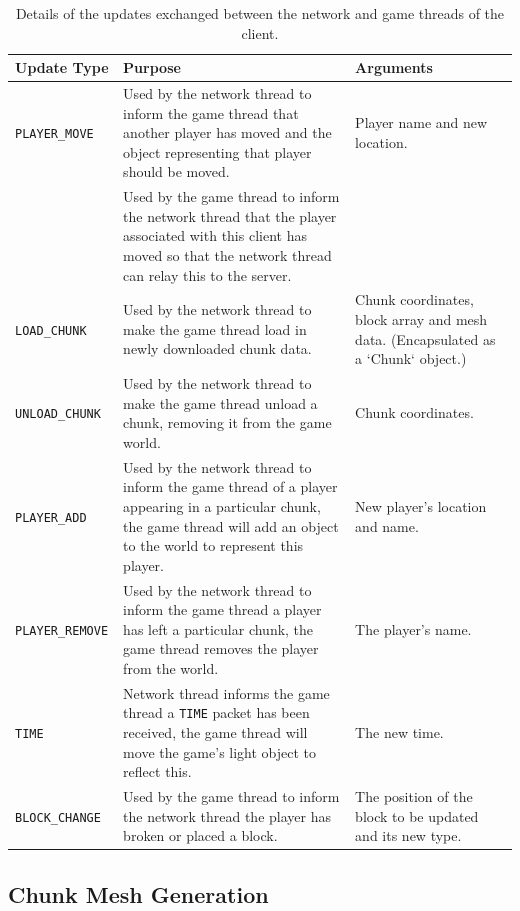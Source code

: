 \documentclass[10pt,twoside,notitlepage,a4paper]{report}
\begin{document}
	\begin{table}
		\begin{tabularx}{\textwidth}{| l | X | p{3cm} |}
			\hline
			\bf Update Type & Purpose & Arguments \\
			\hline
			\tt PLAYER\_MOVE & Used by the network thread to inform the game thread that another player has moved and the object representing that player should be moved. & Player name and new location.\\
			\cline{2-2}
			\tt & Used by the game thread to inform the network thread that the player associated with this client has moved so that the network thread can relay this to the server. & \\
			\hline
			\tt LOAD\_CHUNK & Used by the network thread to make the game thread load in newly downloaded chunk data. & Chunk coordinates, block array and mesh data. (Encapsulated as a `Chunk` object.) \\
			\hline
			\tt UNLOAD\_CHUNK & Used by the network thread to make the game thread unload a chunk, removing it from the game world. & Chunk coordinates. \\
			\hline
			\tt PLAYER\_ADD & Used by the network thread to inform the game thread of a player appearing in a particular chunk, the game thread will add an object to the world to represent this player. & New player's location and name. \\
			\hline
			\tt PLAYER\_REMOVE & Used by the network thread to inform the game thread a player has left a particular chunk, the game thread removes the player from the world. & The player's name. \\
			\hline
			\tt TIME & Network thread informs the game thread a \texttt{TIME} packet has been received, the game thread will move the game's light object to reflect this. & The new time. \\
			\hline
			\tt BLOCK\_CHANGE & Used by the game thread to inform the network thread the player has broken or placed a block. & The position of the block to be updated and its new type.\\
			\hline
		\end{tabularx}
		\caption{Details of the updates exchanged between the network and game threads of the client.}
		\label{tab:updates}
	\end{table}
	
	\subsection{Chunk Mesh Generation}
	\label{sec:mesh}
	
\end{document}
